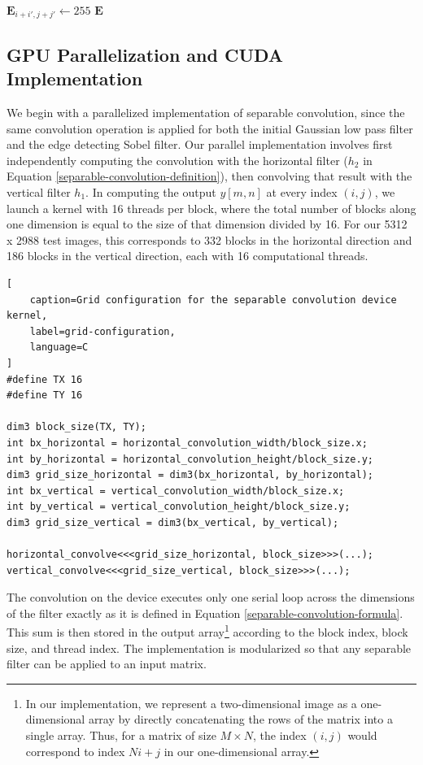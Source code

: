 \documentclass[journal]{IEEEtran}
\begin{document}
\begin{algorithm}[h]
{{			\nl {} {
				 {
					 {
						\nl {} {
							\nl $\boldsymbol{E}_{i + i', j + j'} \gets 255$\;
						}
					}
				}
			}
		}
	}
	\nl \Return $\boldsymbol{E}$\;
	\
\end{algorithm}

\subsection{GPU Parallelization and CUDA Implementation}
We begin with a parallelized implementation of separable convolution, since the same convolution operation is applied for both the initial Gaussian low pass filter and the edge detecting Sobel filter. Our parallel implementation involves first independently computing the convolution with the horizontal filter ($h_2$ in Equation \eqref{separable-convolution-definition}), then convolving that result with the vertical filter $h_1$. In computing the output $y[m, n]$ at every index $(i, j)$, we launch a kernel with 16 threads per block, where the total number of blocks along one dimension is equal to the size of that dimension divided by 16. For our 5312 x 2988 test images, this corresponds to 332 blocks in the horizontal direction and 186 blocks in the vertical direction, each with 16 computational threads.
\begin{lstlisting}[
	caption=Grid configuration for the separable convolution device kernel,
	label=grid-configuration,
	language=C
]
#define TX 16
#define TY 16

dim3 block_size(TX, TY);
int bx_horizontal = horizontal_convolution_width/block_size.x;
int by_horizontal = horizontal_convolution_height/block_size.y;
dim3 grid_size_horizontal = dim3(bx_horizontal, by_horizontal);
int bx_vertical = vertical_convolution_width/block_size.x;
int by_vertical = vertical_convolution_height/block_size.y;
dim3 grid_size_vertical = dim3(bx_vertical, by_vertical);

horizontal_convolve<<<grid_size_horizontal, block_size>>>(...);
vertical_convolve<<<grid_size_vertical, block_size>>>(...);
\end{lstlisting}
\par The convolution on the device executes only one serial loop across the dimensions of the filter exactly as it is defined in Equation \eqref{separable-convolution-formula}. This sum is then stored in the output array\footnote{In our implementation, we represent a two-dimensional image as a one-dimensional array by directly concatenating the rows of the matrix into a single array. Thus, for a matrix of size $M \times N$, the index $(i, j)$ would correspond to index $Ni + j$ in our one-dimensional array.} according to the block index, block size, and thread index. The implementation is modularized so that any separable filter can be applied to an input matrix.
\end{document}

